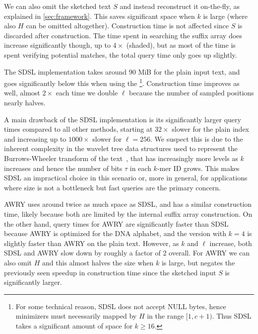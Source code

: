We can also omit the sketched text $S$ and
instead reconstruct it on-the-fly, as explained in \cref{sec:framework}. This saves significant space when $k$ is
large (where also $H$ can be omitted altogether). Construction time is not affected since $S$ is discarded after construction. The time spent in searching the suffix array
does increase significantly though, up to $4\times$ (shaded), but as most of the time
is spent verifying potential matches, the total query time only goes up slightly.

\parag{{\fmindex}}
The SDSL implementation takes around 90 MiB for the plain input text, and goes significantly below this when using the {\uindex}\footnote{For some technical reason, SDSL does not accept NULL bytes, hence minimizers must necessarily mapped by $H$ in the range $[1,c+1)$. Thus SDSL takes a
significant amount of space for $k \geq 16$.}.
Construction time improves as well, almost
$2\times$ each time we double $\ell$ because the number of sampled positions nearly halves.

A main drawback of the SDSL implementation is its significantly larger query times compared to all
other methods, starting at $32\times$ slower for the plain index and increasing up to $1000\times$ slower for $\ell=256$.
We suspect this is due to the inherent complexity in the wavelet tree data structures used to represent the Burrows-Wheeler transform of the text~\cite{burrows1994block}, that has
increasingly more levels as $k$ increases and hence the number of bits $\tau$ in each $k$-mer ID grows.
This makes SDSL an impractical choice in this scenario or, more in general, for applications where size is
not a bottleneck but fast queries are the primary concern.

AWRY uses around twice as much space as SDSL, and has a similar construction
time, likely because both are limited by the internal suffix array construction.
On the other hand, query times for AWRY are significantly faster than SDSL because AWRY is optimized for the DNA alphabet, and the {\uindex} version
with $k=4$ is slightly faster than AWRY on the plain text. However, as $k$ and
$\ell$ increase, both SDSL and AWRY slow down by roughly a factor of 2 overall.
For AWRY we can also omit $H$ and this almost halves the size when $k$
is large, but negates the previously seen speedup in construction time since the
sketched input $S$ is significantly larger.


